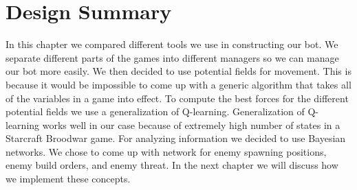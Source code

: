 \section{Design Summary}
In this chapter we compared different tools we use in constructing our bot. We separate different parts of the games into different managers so we can manage our bot more easily. We then decided to use potential fields for movement. This is because it would be impossible to come up with a generic algorithm that takes all of the variables in a game into effect. To compute the best forces for the different potential fields we use a generalization of Q-learning. Generalization of Q-learning works well in our case because of extremely high number of states in a Starcraft Broodwar game. For analyzing information we decided to use Bayesian networks. We chose to come up with network for enemy spawning positions, enemy build orders, and enemy threat. In the next chapter we will discuss how we implement these concepts. 